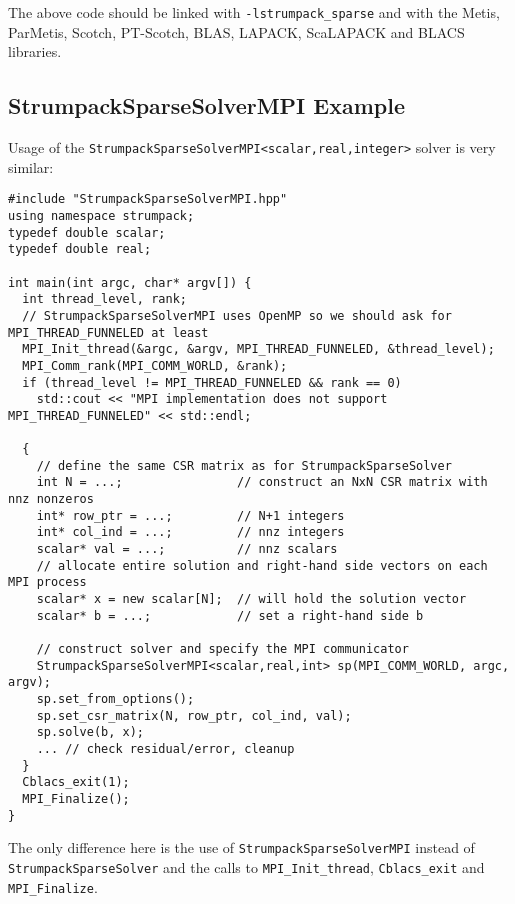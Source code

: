 \documentclass{article}
\begin{document}
The above code should be linked with
\lstinline[style=Bash]!-lstrumpack_sparse! and with the Metis,
ParMetis, Scotch, PT-Scotch, BLAS, LAPACK, ScaLAPACK and BLACS
libraries.\\

\subsection{StrumpackSparseSolverMPI Example}
Usage of the
\lstinline[style=C]!StrumpackSparseSolverMPI<scalar,real,integer>!
solver is very similar:
\begin{lstlisting}[style=C]
#include "StrumpackSparseSolverMPI.hpp"
using namespace strumpack;
typedef double scalar;
typedef double real;

int main(int argc, char* argv[]) {
  int thread_level, rank;
  // StrumpackSparseSolverMPI uses OpenMP so we should ask for MPI_THREAD_FUNNELED at least
  MPI_Init_thread(&argc, &argv, MPI_THREAD_FUNNELED, &thread_level);
  MPI_Comm_rank(MPI_COMM_WORLD, &rank);
  if (thread_level != MPI_THREAD_FUNNELED && rank == 0)
    std::cout << "MPI implementation does not support MPI_THREAD_FUNNELED" << std::endl;

  {
    // define the same CSR matrix as for StrumpackSparseSolver
    int N = ...;                // construct an NxN CSR matrix with nnz nonzeros
    int* row_ptr = ...;         // N+1 integers
    int* col_ind = ...;         // nnz integers
    scalar* val = ...;          // nnz scalars
    // allocate entire solution and right-hand side vectors on each MPI process
    scalar* x = new scalar[N];  // will hold the solution vector
    scalar* b = ...;            // set a right-hand side b

    // construct solver and specify the MPI communicator
    StrumpackSparseSolverMPI<scalar,real,int> sp(MPI_COMM_WORLD, argc, argv);
    sp.set_from_options();
    sp.set_csr_matrix(N, row_ptr, col_ind, val);
    sp.solve(b, x);
    ... // check residual/error, cleanup
  }
  Cblacs_exit(1);
  MPI_Finalize();
}
\end{lstlisting}
The only difference here is the use of
\lstinline[style=C]!StrumpackSparseSolverMPI! instead of
\lstinline[style=C]!StrumpackSparseSolver! and the calls to
\lstinline[style=C]!MPI_Init_thread!, \lstinline[style=C]!Cblacs_exit!
and \lstinline[style=C]!MPI_Finalize!.\\
\end{document}

